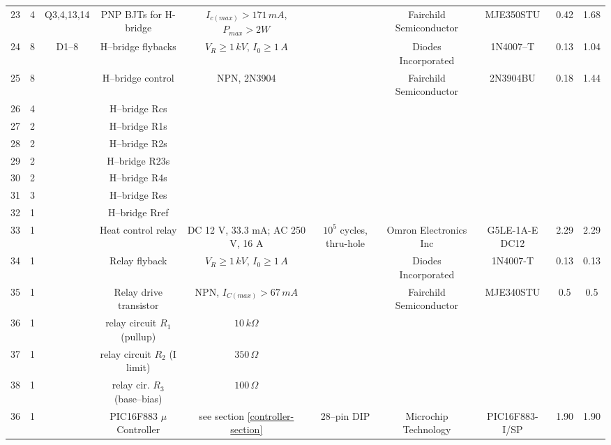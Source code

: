\documentclass[10pt, twocolumn]{article}
\begin{document}
\begin{center}
\begin{adjustbox}{max width=\textwidth}
\begin{tabular}{c c c c c c c c c c}
23	&4	&Q3,4,13,14	&PNP BJTs for H-bridge	&$I_{c(max)}>171\,mA$, $P_{max}>2W$	&
	&Fairchild Semiconductor	&MJE350STU	&0.42		&1.68	\\

24	&8	&D1--8	&H--bridge flybacks	&$V_{R}\geq1\,kV$, $I_{0}\geq 1\,A$	&
	&Diodes Incorporated	&1N4007--T		&0.13		&1.04	\\

25	&8	&	&H--bridge control	&NPN, 2N3904			&
	&Fairchild Semiconductor	&2N3904BU	&0.18		&1.44	\\

26	&4	&	&H--bridge Rcs			&					&
	&			&			&		&	\\

27	&2	&	&H--bridge R1s			&					&
	&			&			&		&	\\

28	&2	&	&H--bridge R2s			&					&
	&			&			&		&	\\

29	&2	&	&H--bridge R23s			&					&
	&			&			&		&	\\

30	&2	&	&H--bridge R4s			&					&
	&			&			&		&	\\

31	&3	&	&H--bridge Res			&					&
	&			&			&		&	\\

32	&1	&	&H--bridge Rref			&					&
	&			&			&		&	\\

33	&1	&	&Heat control relay		&DC 12 V, 33.3 mA; AC 250 V, 16 A	&$10^5$ cycles, thru-hole
	&Omron Electronics Inc	&G5LE-1A-E DC12		&2.29		&2.29	\\

34	&1	&	&Relay flyback			&$V_{R}\geq1\,kV$, $I_{0}\geq1\,A$	&
	&Diodes Incorporated	&1N4007-T			&0.13	&0.13	\\

35	&1	&	&Relay drive transistor		&NPN, $I_{C(max)}>67\,mA$		&
	&Fairchild Semiconductor	&MJE340STU	&0.5		&0.5	\\

36	&1	&	&relay circuit $R_{1}$ (pullup)	&$10\,k\Omega$				&
	&				&		&		&	\\

37	&1	&	&relay circuit $R_{2}$ (I limit)	&$350\,\Omega$			&
	&				&		&		&	\\

38	&1	&	&relay cir. $R_{3}$ (base--bias)	&$100\,\Omega$			&
	&				&		&		&	\\

36	&1	&	&PIC16F883 $\mu$Controller	&see section \ref{controller-section}	&28--pin DIP
	&Microchip Technology	&PIC16F883-I/SP		&1.90		&1.90	\\


\end{tabular}
\end{adjustbox}
\end{center}
\end{document}
